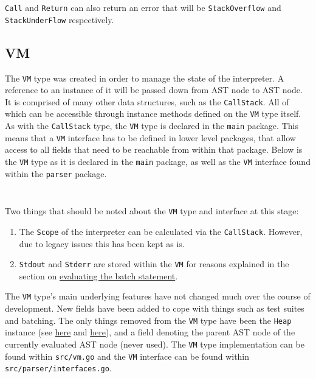 \inputminted[firstline=140, lastline=151, autogobble, breaklines, tabsize=4]{go}{../../src/call.go}

\verb|Call| and \verb|Return| can also return an error that will be \verb|StackOverflow| and \verb|StackUnderFlow| respectively.

\subsection{VM}
\label{sec:data-structures-vm}

The \verb|VM| type was created in order to manage the state of the interpreter. A reference to an instance of it will be passed down from AST node to AST node. It is comprised of many other data structures, such as the \verb|CallStack|. All of which can be accessible through instance methods defined on the \verb|VM| type itself. As with the \verb|CallStack| type, the \verb|VM| type is declared in the \verb|main| package. This means that a \verb|VM| interface has to be defined in lower level packages, that allow access to all fields that need to be reachable from within that package. Below is the \verb|VM| type as it is declared in the \verb|main| package, as well as the \verb|VM| interface found within the \verb|parser| package.

\inputminted[firstline=15, lastline=37, autogobble, breaklines, tabsize=4]{go}{../../src/vm.go}

\inputminted[firstline=18, lastline=60, autogobble, breaklines, tabsize=4]{go}{../../src/parser/interfaces.go}

Two things that should be noted about the \verb|VM| type and interface at this stage:

\begin{enumerate}
    \item The \verb|Scope| of the interpreter can be calculated via the \verb|CallStack|. However, due to legacy issues this has been kept as is.
    \item \verb|Stdout| and \verb|Stderr| are stored within the \verb|VM| for reasons explained in the section on \hyperref[sec:eval-ast-nodes-batch]{evaluating the batch statement}.
\end{enumerate}

The \verb|VM| type's main underlying features have not changed much over the course of development. New fields have been added to cope with things such as test suites and batching. The only things removed from the \verb|VM| type have been the \verb|Heap| instance (see \hyperref[sec:data-structures-frames-callstack]{here} and \hyperref[sec:data-structures-heap]{here}), and a field denoting the parent AST node of the currently evaluated AST node (never used). The \verb|VM| type implementation can be found within \verb|src/vm.go| and the \verb|VM| interface can be found within \verb|src/parser/interfaces.go|.
